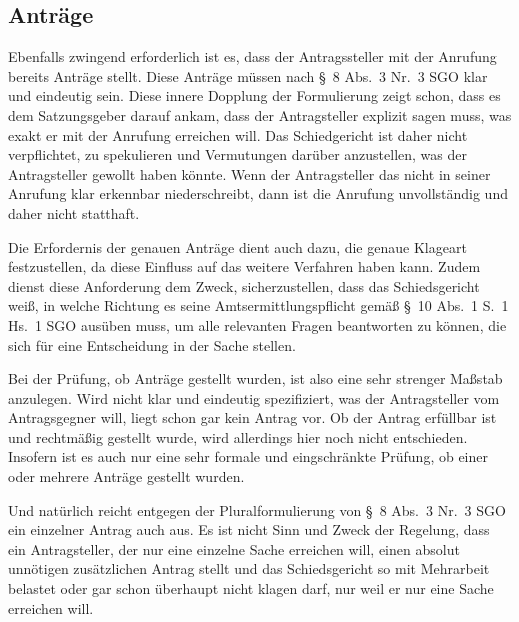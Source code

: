 \subsection{Anträge}
\label{Anrufung:Statthaftigkeit:Antraege}
Ebenfalls zwingend erforderlich ist es, dass der Antragssteller mit der Anrufung bereits Anträge stellt.
Diese Anträge müssen nach \S~8 Abs.~3 Nr.~3 SGO klar und eindeutig sein.
Diese innere Dopplung der Formulierung zeigt schon, dass es dem Satzungsgeber darauf ankam, dass der Antragsteller explizit sagen muss, was exakt er mit der Anrufung erreichen will.
Das Schiedgericht ist daher nicht verpflichtet, zu spekulieren und Vermutungen darüber anzustellen, was der Antragsteller gewollt haben könnte. 
Wenn der Antragsteller das nicht in seiner Anrufung klar erkennbar niederschreibt, dann ist die Anrufung unvollständig und daher nicht statthaft.

Die Erfordernis der genauen Anträge dient auch dazu, die genaue Klageart festzustellen, da diese Einfluss auf das weitere Verfahren haben kann.
Zudem dienst diese Anforderung dem Zweck, sicherzustellen, dass das Schiedsgericht weiß, in welche Richtung es seine Amtsermittlungspflicht gemäß \S~10 Abs.~1 S.~1 Hs.~1 SGO ausüben muss, um alle relevanten Fragen beantworten zu können, die sich für eine Entscheidung in der Sache stellen.

Bei der Prüfung, ob Anträge gestellt wurden, ist also eine sehr strenger Maßstab anzulegen. Wird nicht klar und eindeutig spezifiziert, was der Antragsteller vom Antragsgegner will, liegt schon gar kein Antrag vor.
Ob der Antrag erfüllbar ist und rechtmäßig gestellt wurde, wird allerdings hier noch nicht entschieden.
Insofern ist es auch nur eine sehr formale und eingschränkte Prüfung, ob einer oder mehrere Anträge gestellt wurden.

Und natürlich reicht entgegen der Pluralformulierung von \S~8 Abs.~3 Nr.~3 SGO ein einzelner Antrag auch aus. Es ist nicht Sinn und Zweck der Regelung, dass ein Antragsteller, der nur eine einzelne Sache erreichen will, einen absolut unnötigen zusätzlichen Antrag stellt und das Schiedsgericht so mit Mehrarbeit belastet oder gar schon überhaupt nicht klagen darf, nur weil er nur eine Sache erreichen will.

